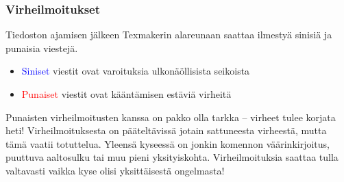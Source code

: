 \begin{frame}[fragile]
    
    
\end{frame}

\begin{frame}
    \frametitle{Virheilmoitukset}
    Tiedoston ajamisen jälkeen Texmakerin alareunaan saattaa ilmestyä sinisiä ja punaisia viestejä.\pause
    \begin{itemize}[<+->]
        \item \textcolor{blue}{Siniset} viestit ovat varoituksia ulkonäöllisista seikoista
        \item \textcolor{red}{Punaiset} viestit ovat kääntämisen estäviä virheitä
    \end{itemize}\pause
    Punaisten virheilmoitusten kanssa on pakko olla tarkka -- virheet tulee korjata heti!
    \vaihto
    \pause
    Virheilmoituksesta on pääteltävissä jotain sattuneesta virheestä, mutta tämä vaatii totuttelua. 
    \pause Yleensä kyseessä on jonkin komennon väärinkirjoitus, puuttuva aaltosulku tai muu pieni yksityiskohta.
    \vaihto
    \pause Virheilmoituksia saattaa tulla valtavasti vaikka kyse olisi yksittäisestä ongelmasta!
\end{frame}


